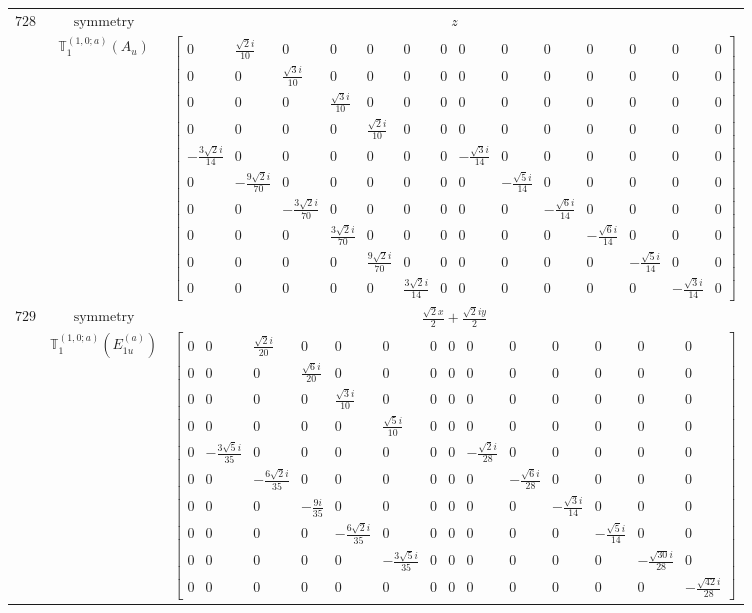 \documentclass[fleqn,8pt,landscape]{jsarticle}
\begin{document}
\begin{longtable}{ccc}
$ 728 $ & $ \text{symmetry} $ & $ z $ \\
$  $ & $ \mathbb{T}_{1}^{(1,0;a)}(A_{u}) $ & $ \begin{bmatrix} 0 & \frac{\sqrt{2} i}{10} & 0 & 0 & 0 & 0 & 0 & 0 & 0 & 0 & 0 & 0 & 0 & 0 \\ 0 & 0 & \frac{\sqrt{3} i}{10} & 0 & 0 & 0 & 0 & 0 & 0 & 0 & 0 & 0 & 0 & 0 \\ 0 & 0 & 0 & \frac{\sqrt{3} i}{10} & 0 & 0 & 0 & 0 & 0 & 0 & 0 & 0 & 0 & 0 \\ 0 & 0 & 0 & 0 & \frac{\sqrt{2} i}{10} & 0 & 0 & 0 & 0 & 0 & 0 & 0 & 0 & 0 \\ - \frac{3 \sqrt{2} i}{14} & 0 & 0 & 0 & 0 & 0 & 0 & - \frac{\sqrt{3} i}{14} & 0 & 0 & 0 & 0 & 0 & 0 \\ 0 & - \frac{9 \sqrt{2} i}{70} & 0 & 0 & 0 & 0 & 0 & 0 & - \frac{\sqrt{5} i}{14} & 0 & 0 & 0 & 0 & 0 \\ 0 & 0 & - \frac{3 \sqrt{2} i}{70} & 0 & 0 & 0 & 0 & 0 & 0 & - \frac{\sqrt{6} i}{14} & 0 & 0 & 0 & 0 \\ 0 & 0 & 0 & \frac{3 \sqrt{2} i}{70} & 0 & 0 & 0 & 0 & 0 & 0 & - \frac{\sqrt{6} i}{14} & 0 & 0 & 0 \\ 0 & 0 & 0 & 0 & \frac{9 \sqrt{2} i}{70} & 0 & 0 & 0 & 0 & 0 & 0 & - \frac{\sqrt{5} i}{14} & 0 & 0 \\ 0 & 0 & 0 & 0 & 0 & \frac{3 \sqrt{2} i}{14} & 0 & 0 & 0 & 0 & 0 & 0 & - \frac{\sqrt{3} i}{14} & 0 \end{bmatrix} $ \\ \hline
$ 729 $ & $ \text{symmetry} $ & $ \frac{\sqrt{2} x}{2} + \frac{\sqrt{2} i y}{2} $ \\
$  $ & $ \mathbb{T}_{1}^{(1,0;a)}(E_{1u}^{(a)}) $ & $ \begin{bmatrix} 0 & 0 & \frac{\sqrt{2} i}{20} & 0 & 0 & 0 & 0 & 0 & 0 & 0 & 0 & 0 & 0 & 0 \\ 0 & 0 & 0 & \frac{\sqrt{6} i}{20} & 0 & 0 & 0 & 0 & 0 & 0 & 0 & 0 & 0 & 0 \\ 0 & 0 & 0 & 0 & \frac{\sqrt{3} i}{10} & 0 & 0 & 0 & 0 & 0 & 0 & 0 & 0 & 0 \\ 0 & 0 & 0 & 0 & 0 & \frac{\sqrt{5} i}{10} & 0 & 0 & 0 & 0 & 0 & 0 & 0 & 0 \\ 0 & - \frac{3 \sqrt{5} i}{35} & 0 & 0 & 0 & 0 & 0 & 0 & - \frac{\sqrt{2} i}{28} & 0 & 0 & 0 & 0 & 0 \\ 0 & 0 & - \frac{6 \sqrt{2} i}{35} & 0 & 0 & 0 & 0 & 0 & 0 & - \frac{\sqrt{6} i}{28} & 0 & 0 & 0 & 0 \\ 0 & 0 & 0 & - \frac{9 i}{35} & 0 & 0 & 0 & 0 & 0 & 0 & - \frac{\sqrt{3} i}{14} & 0 & 0 & 0 \\ 0 & 0 & 0 & 0 & - \frac{6 \sqrt{2} i}{35} & 0 & 0 & 0 & 0 & 0 & 0 & - \frac{\sqrt{5} i}{14} & 0 & 0 \\ 0 & 0 & 0 & 0 & 0 & - \frac{3 \sqrt{5} i}{35} & 0 & 0 & 0 & 0 & 0 & 0 & - \frac{\sqrt{30} i}{28} & 0 \\ 0 & 0 & 0 & 0 & 0 & 0 & 0 & 0 & 0 & 0 & 0 & 0 & 0 & - \frac{\sqrt{42} i}{28} \end{bmatrix} $ \\ \hline

\end{longtable}
\end{document}
